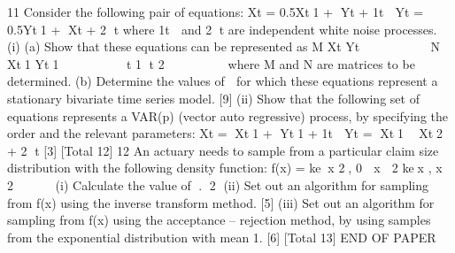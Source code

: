 \documentclass[a4paper,12pt]{article}
\begin{document}
11 Consider the following pair of equations:
  Xt = 0.5Xt1 + Yt + 1t
  
  Yt = 0.5Yt1 + Xt + 2
  t
  where 1t
   and 2
  t are independent white noise processes.
  (i) (a) Show that these equations can be represented as
  M
  Xt
  Yt
  
  
  
  
  
  
   N
  Xt1
  Yt1
  
  
  
  
  
  
  
  t
  1
  t
  2
  
  
  
  
  
  
  where M and N are matrices to be determined.
  (b) Determine the values of  for which these equations represent a
  stationary bivariate time series model. [9]
  (ii) Show that the following set of equations represents a VAR(p) (vector auto
                                                                     regressive) process, by specifying the order and the relevant parameters:
    Xt = Xt1 + Yt1 + 1t
  
  Yt = Xt1  Xt2 + 2
  t
  [3]
  [Total 12]
  12 An actuary needs to sample from a particular claim size distribution with the
  following density function:
    f(x) = kex 2, 0  x  2
  kex , x  2
  
   
   
  (i) Calculate the value of 􀝇. 􁈾2􁈿
  (ii) Set out an algorithm for sampling from f(x) using the inverse transform
  method. [5]
  (iii) Set out an algorithm for sampling from f(x) using the acceptance – rejection
  method, by using samples from the exponential distribution with mean 1. [6]
  [Total 13]
  END OF PAPER
  
\end{document}
